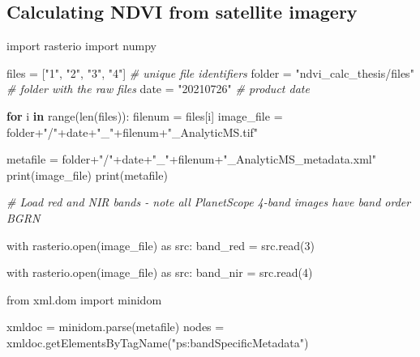 \documentclass[12pt,twoside]{reedthesis}
\newenvironment{Shaded}{\begin{snugshade}}{\end{snugshade}}
\newcommand{\CommentTok}[1]{\textcolor[rgb]{0.56,0.35,0.01}{\textit{#1}}}
\newcommand{\ControlFlowTok}[1]{\textcolor[rgb]{0.13,0.29,0.53}{\textbf{#1}}}
\newcommand{\DecValTok}[1]{\textcolor[rgb]{0.00,0.00,0.81}{#1}}
\newcommand{\FunctionTok}[1]{\textcolor[rgb]{0.00,0.00,0.00}{#1}}
\newcommand{\NormalTok}[1]{#1}
\newcommand{\OtherTok}[1]{\textcolor[rgb]{0.56,0.35,0.01}{#1}}
\newcommand{\SpecialCharTok}[1]{\textcolor[rgb]{0.00,0.00,0.00}{#1}}
\newcommand{\StringTok}[1]{\textcolor[rgb]{0.31,0.60,0.02}{#1}}
\begin{document}
\hypertarget{calculating-ndvi-from-satellite-imagery}{%
\subsection{Calculating NDVI from satellite imagery}\label{calculating-ndvi-from-satellite-imagery}}
\begin{Shaded}
\begin{Highlighting}[]
\NormalTok{import rasterio}
\NormalTok{import numpy}

\NormalTok{files }\OtherTok{=}\NormalTok{ [}\StringTok{"1"}\NormalTok{, }\StringTok{"2"}\NormalTok{, }\StringTok{"3"}\NormalTok{, }\StringTok{"4"}\NormalTok{] }\CommentTok{\# unique file identifiers}
\NormalTok{folder }\OtherTok{=} \StringTok{"ndvi\_calc\_thesis/files"} \CommentTok{\# folder with the raw files}
\NormalTok{date }\OtherTok{=} \StringTok{"20210726"} \CommentTok{\# product date}


\ControlFlowTok{for}\NormalTok{ i }\ControlFlowTok{in} \FunctionTok{range}\NormalTok{(}\FunctionTok{len}\NormalTok{(files))}\SpecialCharTok{:}
\NormalTok{    filenum }\OtherTok{=}\NormalTok{ files[i]}
\NormalTok{    image\_file }\OtherTok{=}\NormalTok{ folder}\SpecialCharTok{+}\StringTok{"/"}\SpecialCharTok{+}\NormalTok{date}\SpecialCharTok{+}\StringTok{"\_"}\SpecialCharTok{+}\NormalTok{filenum}\SpecialCharTok{+}\StringTok{"\_AnalyticMS.tif"}

\NormalTok{    metafile }\OtherTok{=}\NormalTok{ folder}\SpecialCharTok{+}\StringTok{"/"}\SpecialCharTok{+}\NormalTok{date}\SpecialCharTok{+}\StringTok{"\_"}\SpecialCharTok{+}\NormalTok{filenum}\SpecialCharTok{+}\StringTok{"\_AnalyticMS\_metadata.xml"}
    \FunctionTok{print}\NormalTok{(image\_file)}
    \FunctionTok{print}\NormalTok{(metafile)}

    \CommentTok{\# Load red and NIR bands {-} note all PlanetScope 4{-}band images have band order BGRN}

\NormalTok{    with }\FunctionTok{rasterio.open}\NormalTok{(image\_file) as src}\SpecialCharTok{:}
\NormalTok{        band\_red }\OtherTok{=} \FunctionTok{src.read}\NormalTok{(}\DecValTok{3}\NormalTok{)}

\NormalTok{    with }\FunctionTok{rasterio.open}\NormalTok{(image\_file) as src}\SpecialCharTok{:}
\NormalTok{        band\_nir }\OtherTok{=} \FunctionTok{src.read}\NormalTok{(}\DecValTok{4}\NormalTok{)}

\NormalTok{    from xml.dom import minidom}

\NormalTok{    xmldoc }\OtherTok{=} \FunctionTok{minidom.parse}\NormalTok{(metafile)}
\NormalTok{    nodes }\OtherTok{=} \FunctionTok{xmldoc.getElementsByTagName}\NormalTok{(}\StringTok{"ps:bandSpecificMetadata"}\NormalTok{)}


\end{Highlighting}
\end{Shaded}
\end{document}
